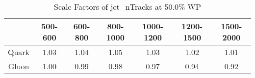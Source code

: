 \begin{table}
\centering
\caption{Scale Factors of jet_nTracks at 50.0\% WP}
\label{tab:jet_nTracks_0.5_Gluon}
\begin{tabular}{ccccccc}
\toprule
{} &  500-600 &  600-800 &  800-1000 &  1000-1200 &  1200-1500 &  1500-2000 \\
\midrule
Quark &     1.03 &     1.04 &      1.05 &       1.03 &       1.02 &       1.01 \\
Gluon &     1.00 &     0.99 &      0.98 &       0.97 &       0.94 &       0.92 \\
\bottomrule
\end{tabular}
\end{table}
